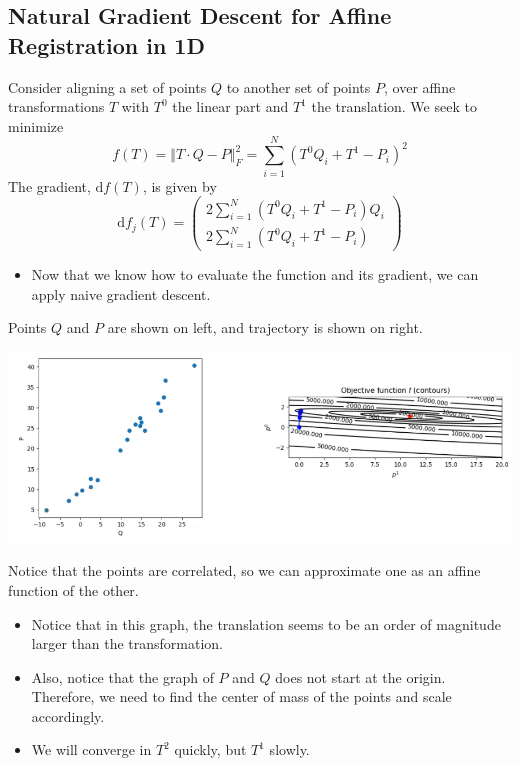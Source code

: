 \documentclass[10pt]{article}
\newcommand{\dd}{\text{d}}
\begin{document}
\subsection*{Natural Gradient Descent for Affine Registration in 1D}
Consider aligning a set of points $Q$ to another set of points $P$, over affine transformations $T$ with $T^0$ the linear part and $T^1$ the translation.  We seek to minimize
\[f(T) = \Vert T \cdot Q - P \Vert_F^2 = \sum_{i = 1}^N (T^0 Q_i + T^1 - P_i)^2\]
The gradient, $\dd f(T)$, is given by
\[\dd f_j(T) = \begin{pmatrix} 2 \sum_{i = 1}^N (T^0 Q_i + T^1 - P_i) Q_i \\ 2 \sum_{i = 1}^N (T^0 Q_i + T^1 - P_i) \end{pmatrix}\]
\begin{itemize}
	\item Now that we know how to evaluate the function and its gradient, we can apply naive gradient descent.
\end{itemize}
Points $Q$ and $P$ are shown on left, and trajectory is shown on right.
\begin{center} 
	\includegraphics*[width=\textwidth]{W8_6.png} 
\end{center}
Notice that the points are correlated, so we can approximate one as an affine function of the other.
\begin{itemize}
	\item Notice that in this graph, the translation seems to be an order of magnitude larger than the transformation.
	\item Also, notice that the graph of $P$ and $Q$ does not start at the origin.  Therefore, we need to find the center of mass of the points and scale accordingly.
	\item We will converge in $T^2$ quickly, but $T^1$ slowly.
\end{itemize}
\end{document}
